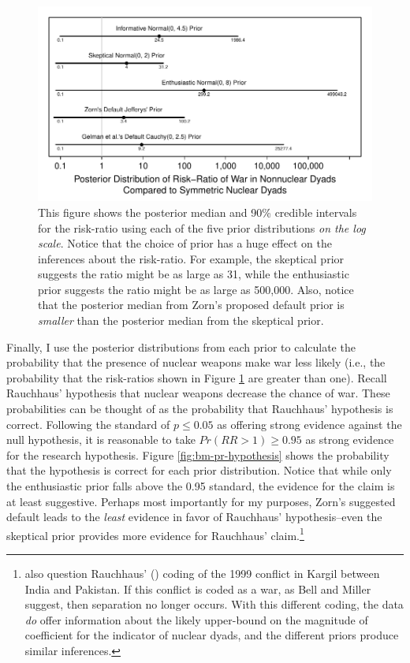 \documentclass[12pt]{article}
\begin{document}
\begin{figure}[H]
\begin{center}
\includegraphics[scale = .8]{figs/bm-rr.pdf}
\caption{This figure shows the posterior median and 90\% credible intervals for the risk-ratio using each of the five prior distributions \emph{on the log scale}. Notice that the choice of prior has a huge effect on the inferences about the risk-ratio. For example, the skeptical prior suggests the ratio might be as large as 31, while the enthusiastic prior suggests the ratio might be as large as 500,000. Also, notice that the posterior median from Zorn's proposed default prior is \emph{smaller} than the posterior median from the skeptical prior.}\label{fig:bm-rr}
\end{center}
\end{figure}

Finally, I use the posterior distributions from each prior to calculate the probability that the presence of nuclear weapons make war less likely (i.e., the probability that the risk-ratios shown in Figure \ref{fig:bm-rr} are greater than one). Recall Rauchhaus' hypothesis that nuclear weapons decrease the chance of war. These probabilities can be thought of as the probability that Rauchhaus' hypothesis is correct. Following the standard of $p \leq 0.05$ as offering strong evidence against the null hypothesis, it is reasonable to take $Pr(RR > 1) \geq 0.95$ as strong evidence for the research hypothesis. Figure \ref{fig:bm-pr-hypothesis} shows the probability that the hypothesis is correct for each prior distribution. Notice that while only the enthusiastic prior falls above the 0.95 standard, the evidence for the claim is at least suggestive. Perhaps most importantly for my purposes, Zorn's suggested default leads to the \emph{least} evidence in favor of Rauchhaus' hypothesis--even the skeptical prior provides more evidence for Rauchhaus' claim.\footnote{\cite{BellMiller2015} also question Rauchhaus' (\citeyear{Rauchhaus2009}) coding of the 1999 conflict in Kargil between India and Pakistan. If this conflict is coded as a war, as Bell and Miller suggest, then separation no longer occurs. With this different coding, the data \textit{do} offer information about the likely upper-bound on the magnitude of coefficient for the indicator of nuclear dyads, and the different priors produce similar inferences.}
\end{document}
